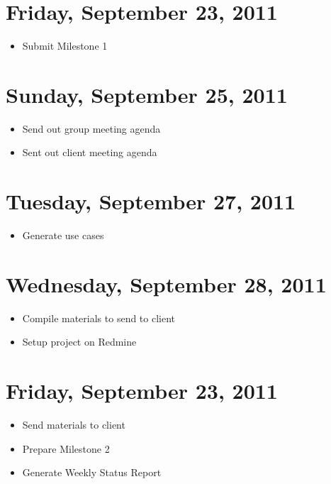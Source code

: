 \documentclass{article}
\begin{document}
\section{Friday, September 23, 2011}
\begin{itemize}
\item Submit Milestone 1
\end{itemize}

\section{Sunday, September 25, 2011}
\begin{itemize}
\item Send out group meeting agenda
\item Sent out client meeting agenda
\end{itemize}

\section{Tuesday, September 27, 2011}
\begin{itemize}
\item Generate use cases
\end{itemize}

\section{Wednesday, September 28, 2011}
\begin{itemize}
\item Compile materials to send to client
\item Setup project on Redmine
\end{itemize}

\section{Friday, September 23, 2011}
\begin{itemize}
\item Send materials to client
\item Prepare Milestone 2
\item Generate Weekly Status Report
\end{itemize}
\end{document}
